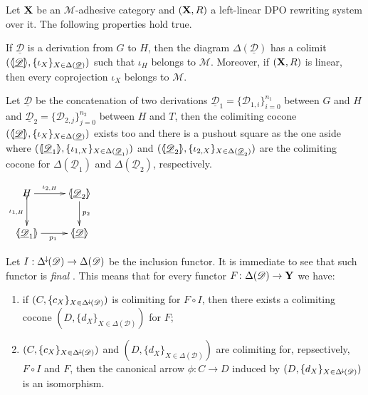 \documentclass[a4paper,UKenglish,cleveref,pdftex, thm-restate,numberwithinsect,anonymous]{lipics}
\newcommand{\Deltamin}{\Delta^{\hspace{-1pt}\downarrow\hspace{-1pt}}}
\def\R{\mathsf{R}}
\def\X{\textbf {\textup{X}}}
\def\Y{\textbf {\textup{Y}}}
\newcommand{\dder}[1]{\mathscr{#1}}
\newcommand{\der}[1]{\underline{\dder{#1}}}
\newcommand{\lpro}{\langle \hspace{-1.85pt}[}
\newcommand{\rpro}{]\hspace{-1.85pt}\rangle}
\newcommand{\tpro}[1]{\lpro \der{#1}\rpro}
\newcommand{\tproi}[2]{\lpro \der{#1}_{#2}\rpro}
\begin{document}
\begin{lemma}\label{lem:colim}
	Let $\X$ be an $\mathcal{M}$-adhesive category and $(\X, \R)$ a
	left-linear DPO rewriting system over it. The following properties
	hold true.
	\begin{enumerate}
		\item  If $\der{D}$ is a derivation from $G$ to $H$, then the diagram $\Delta(\der{D})$ has a colimit $(\tpro{D}, \{\iota_X\}_{X\in \Delta(\der{D})})$ such that $\iota_H$ belongs to $\mathcal{M}$. Moreover, if $(\X, \R)$ is linear, then every coprojection $\iota_X$ belongs to $\mathcal{M}$.
		
		\parbox{10cm}{
		\item Let $\der{D}$ be the concatenation of two derivations $\der{D}_1=\{\dder{D}_{1,i}\}_{i=0}^{n_1}$ between $G$ and $H$ and $\der{D}_2=\{\dder{D}_{2,j}\}_{j=0}^{n_2}$ between $H$ and $T$,  then the colimiting cocone $(\tpro{D}, \{\iota_X\}_{X\in \Delta(\der{D})})$ exists too and there is a pushout square as the one aside
		where $(\tproi{D}{1}, \{\iota_{1, X}\}_{X\in \Delta(\der{D}_1)})$ and $(\tproi{D}{2}, \{\iota_{2, X}\}_{X\in \Delta(\der{D}_2)})$ are the colimiting cocone for $\Delta(\der{D}_1)$ and $\Delta(\der{D}_2)$, respectively.} 
		\parbox{3cm}{\vspace{-.5cm}
		$\xymatrix{H\ar[r]^-{\iota_{2, H}} \ar@{>->}[d]_-{\iota_{1, H}} & \tproi{D}{2} \ar[d]^{p_2}\\  \tproi{D}{1} \ar[r]_{p_1}& \tpro{D}}$}
	\end{enumerate}
\end{lemma}
\begin{remark}\label{rem:cof}
	Let $I:\Deltamin(\dder{D})\to \Delta(\dder{D})$ be the inclusion functor. It is immediate to see that such functor is \emph{final} \cite{mac2013categories}. This means that for every functor $F\colon \Delta(\dder{D})\to \Y$ we have:
	\begin{enumerate}
		\item if  $(C, \{c_X\}_{X\in \Deltamin(\dder{D})})$ is colimiting for $F\circ I$, then there exists a colimiting cocone $(D, \{d_X\}_{X\in \Delta(\dder{D})})$ for $F$;
		\item $(C, \{c_X\}_{X\in \Deltamin(\dder{D})})$ and $(D, \{d_X\}_{X\in \Delta(\dder{D})})$ are colimiting for, repsectively, $F\circ I$ and $F$, then the canonical arrow $\phi\colon C\to D$ induced by $(D, \{d_X\}_{X\in \Deltamin(\dder{D})})$ is an isomorphism.
	\end{enumerate}
\end{remark}
\end{document}
